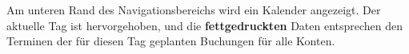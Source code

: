 Am unteren Rand des Navigationsbereichs wird ein Kalender angezeigt. Der aktuelle Tag ist \colorbox[RGB]{198,200,201}{hervorgehoben}, und die \textbf{fettgedruckten} Daten entsprechen den Terminen der für diesen Tag geplanten Buchungen für alle Konten.


